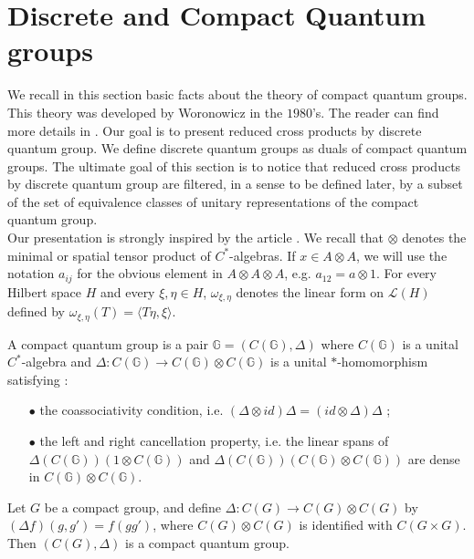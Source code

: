 \section{Discrete and Compact Quantum groups}

We recall in this section basic facts about the theory of compact quantum groups. This theory was developed by Woronowicz in the $1980$'s. The reader can find more details in \cite{Wo}. Our goal is to present reduced cross products by discrete quantum group. We define discrete quantum groups as duals of compact quantum groups. The ultimate goal of this section is to notice that reduced cross products by discrete quantum group are filtered, in a sense to be defined later, by a subset of the set of equivalence classes of unitary representations of the compact quantum group.\\ 

Our presentation is strongly inspired by the article \cite{VerVaes}. We recall that $\otimes$ denotes the minimal or spatial tensor product of $C^*$-algebras. If $x\in A\otimes A$, we will use the notation $a_{ij}$ for the obvious element in $A\otimes A\otimes A$, e.g. $a_{12} = a\otimes 1$. For every Hilbert space $H$ and every $\xi,\eta \in H$, $\omega_{\xi,\eta}$ denotes the linear form on $\mathcal L(H)$ defined by $\omega_{\xi,\eta}(T) = \langle T\eta,\xi\rangle$.

\begin{definition}
A compact quantum group is a pair $\mathbb G = (C(\mathbb G),\Delta)$ where $C(\mathbb G)$ is a unital $C^*$-algebra and $\Delta : C(\mathbb G) \rightarrow C(\mathbb G)\otimes C(\mathbb G)$ is a unital $*$-homomorphism satisfying :
\begin{itemize}
\item[$\bullet$] the coassociativity condition, i.e. $(\Delta \otimes id)\Delta=(id\otimes \Delta )\Delta$ ;
\item[$\bullet$] the left and right cancellation property, i.e. the linear spans of $\Delta(C(\mathbb G))(1\otimes C(\mathbb G))$ and $\Delta(C(\mathbb G))(C(\mathbb G)\otimes C(\mathbb G))$ are dense in $C(\mathbb G)\otimes C(\mathbb G)$.
\end{itemize} 
\end{definition}

\begin{Expl} Let $G$ be a compact group, and define $\Delta : C(G)\rightarrow C(G)\otimes C(G)$ by $(\Delta f)(g,g') = f(gg')$, where $C(G)\otimes C(G)$ is identified with $C(G\times G)$. Then $(C(G),\Delta ) $ is a compact quantum group.
\end{Expl}


